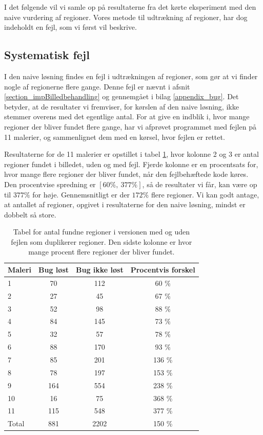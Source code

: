 {
{\sffamily I det følgende vil vi samle op på resultaterne fra det kørte
eksperiment med den naive vurdering af regioner. Vores metode til
udtrækning af regioner, har dog indeholdt en fejl, som vi først vil
beskrive.
}

\subsection{Systematisk fejl\label{program_bug}}
I den naive løsning findes en fejl i udtrækningen af regioner, som gør
at vi finder nogle af regionerne flere gange. Denne fejl er nævnt i
afsnit \ref{section_impBilledbehandling} og gennemgået i bilag
\ref{appendix_bug}. Det betyder, at de resultater vi fremviser, for
kørslen af den naive løsning, ikke stemmer overens med det egentlige
antal. For at give en indblik i, hvor mange regioner der bliver fundet
flere gange, har vi afprøvet programmet med fejlen på 11 malerier, og
sammenlignet dem med en kørsel, hvor fejlen er rettet.

Resultaterne for de 11 malerier er opstillet i tabel \ref{bug_tabel},
hvor kolonne 2 og 3 er antal regioner fundet i billedet, uden og med
fejl.  Fjerde kolonne er en procentsats for, hvor mange flere regioner
der bliver fundet, når den fejlbehæftede kode køres. Den procentvise
spredning er $[60 \%,~377 \%]$, så de resultater vi får, kan være op til
$377\%$ for høje.  Gennemsnitligt er der $172 \%$ flere regioner. Vi kan
godt antage, at antallet af regioner, opgivet i resultaterne for den
naive løsning, mindst er dobbelt så store.

\begin{table}[!h]
    \centering
    \begin{tabular}{|l|c|c|c|}
        \hline
  Maleri  & Bug løst 		& Bug ikke løst		& Procentvis forskel\\\hline
        1   & 70 			& 112 				& 60 \% \\
        2   & 27 			& 45 				& 67 \% \\
        3	& 52 			& 98 				& 88 \% \\
        4   & 84 			& 145 				& 73 \% \\
        5	& 32 			& 57 				& 78 \% \\
        6   & 88 			& 170 				& 93 \% \\
        7   & 85 			& 201 				& 136 \% \\
        8   & 78 			& 197 				& 153 \% \\
        9   & 164 			& 554 				& 238 \% \\
        10	& 16 			& 75 				& 368 \% \\
        11	& 115 			& 548 				& 377 \% \\\hline
	Total	& 881			& 2202				& 150 \% \\\hline
	  \end{tabular}
    \caption[]{Tabel for antal fundne regioner i versionen med og uden
    fejlen som duplikerer regioner. Den sidste kolonne er hvor mange
    procent flere regioner der bliver fundet.}
    \label{bug_tabel}
\end{table}

}
